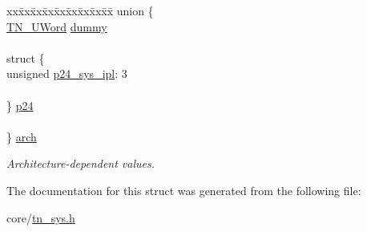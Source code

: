 \begin{DoxyCompactItemize}
\mbox{\label{struct__TN__BuildCfg_a1dc7b3135a4df58cb6ba98848da6f2b5}} 
\begin{tabbing}
xx\=xx\=xx\=xx\=xx\=xx\=xx\=xx\=xx\=\kill
union \{\\
\>\hyperlink{tn__arch__example_8h_ab80cba0fe9ffcd9011d53dfeb9e39bf4}{TN\_UWord} \hyperlink{struct__TN__BuildCfg_a56b4e79a242637802ed1899ebafd4584}{dummy}\\
\>\\
\>struct \{\\
\>\>unsigned \hyperlink{struct__TN__BuildCfg_aebae0e1b53cafcc842d1950b14803ed9}{p24\_sys\_ipl}: 3\\
\>\>\\
\>\} \hyperlink{struct__TN__BuildCfg_a341c140f75ffd85f9f5d4e5cc7966e2b}{p24}\\
\>\>\\
\} \hyperlink{struct__TN__BuildCfg_a1dc7b3135a4df58cb6ba98848da6f2b5}{arch}\\

\end{tabbing}\begin{DoxyCompactList}\small\item\em Architecture-\/dependent values. \end{DoxyCompactList}\end{DoxyCompactItemize}


The documentation for this struct was generated from the following file\+:\begin{DoxyCompactItemize}
\item 
core/\hyperlink{tn__sys_8h}{tn\+\_\+sys.\+h}\end{DoxyCompactItemize}
